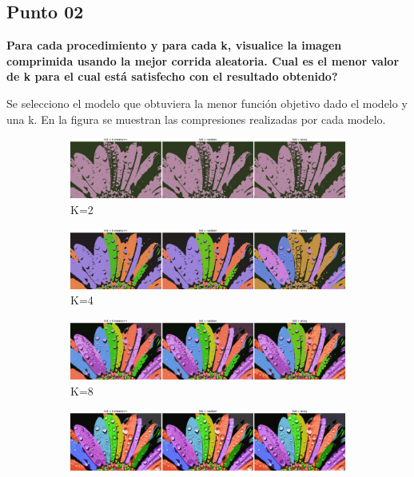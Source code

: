 \subsection*{Punto 02}

\textbf{Para cada procedimiento y para cada k, visualice la imagen comprimida usando la mejor corrida aleatoria. Cual es el menor valor de k para el cual está satisfecho con el resultado obtenido?}

Se selecciono el modelo que obtuviera la menor función objetivo dado el modelo y una k. En la figura se muestran las compresiones realizadas por cada modelo.

\begin{figure}[H]
    \centering
    \begin{subfigure}{17cm}
        \centering
        \includegraphics[width=17cm]{Graphics/Problema_04/cluster_2.png}
        \caption{K=2}
    \end{subfigure}
    \begin{subfigure}{17cm}
        \centering
        \includegraphics[width=17cm]{Graphics/Problema_04/cluster_4.png}
        \caption{K=4}
    \end{subfigure}
    \begin{subfigure}{17cm}
        \centering
        \includegraphics[width=17cm]{Graphics/Problema_04/cluster_8.png}
        \caption{K=8}
    \end{subfigure}
    \begin{subfigure}{17cm}
        \centering
        \includegraphics[width=17cm]{Graphics/Problema_04/cluster_16.png}

\end{subfigure}
\end{figure}
